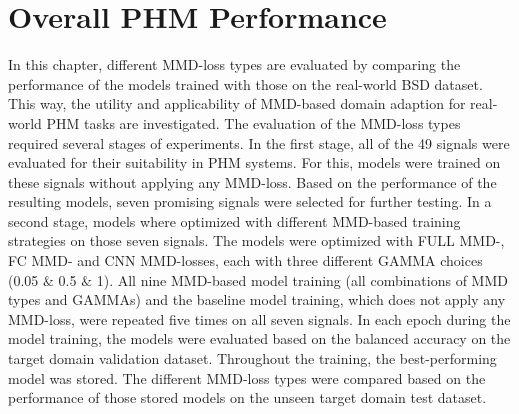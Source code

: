 \section{Overall PHM Performance}\label{ch:PHM_performance}
In this chapter, different MMD-loss types are evaluated by comparing the performance of the models trained with those on the real-world BSD dataset. This way, the utility and applicability of MMD-based domain adaption for real-world PHM tasks are investigated. The evaluation of the MMD-loss types required several stages of experiments.
In the first stage, all of the 49 signals were evaluated for their suitability in PHM systems. For this, models were trained on these signals without applying any MMD-loss. Based on the performance of the resulting models, seven promising signals were selected for further testing. In a second stage, models where optimized with different MMD-based training strategies on those seven signals. The models were optimized with FULL MMD-, FC MMD- and CNN MMD-losses, each with three different GAMMA choices (0.05 $\&$ 0.5 $\&$ 1). All nine MMD-based model training (all combinations of MMD types and GAMMAs) and the baseline model training, which does not apply any MMD-loss, were repeated five times on all seven signals. In each epoch during the model training, the models were evaluated based on the balanced accuracy on the target domain validation dataset. Throughout the training, the best-performing model was stored. The different MMD-loss types were compared based on the performance of those stored models on the unseen target domain test dataset.

